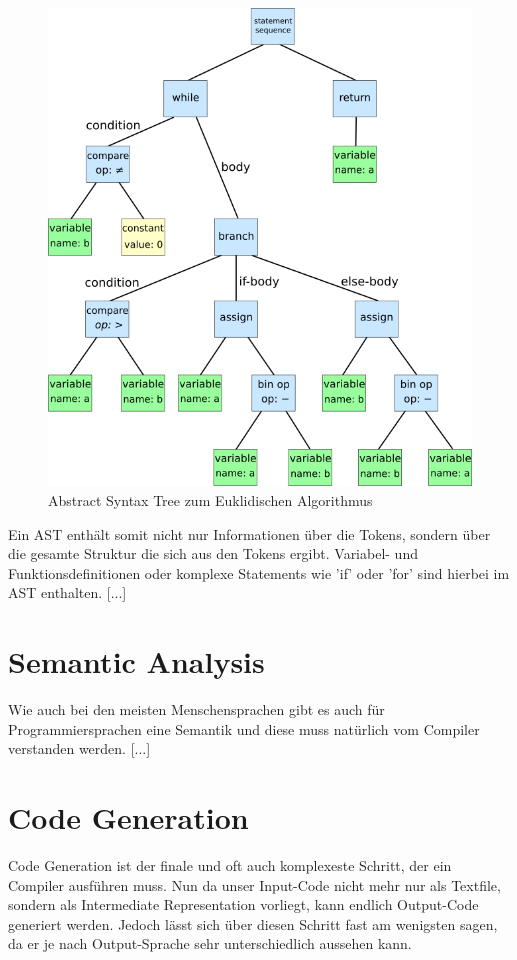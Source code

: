 \begin{figure}[h!]
    \centering
    \includegraphics[scale=0.3]{resources/syntaxtree.svg.png}
    \caption{Abstract Syntax Tree zum Euklidischen Algorithmus}
    \label{fig:syntax-tree}
\end{figure}

Ein AST enthält somit nicht nur Informationen über die Tokens, sondern über die gesamte Struktur die sich aus den Tokens ergibt. Variabel- und Funktionsdefinitionen oder komplexe Statements wie 'if' oder 'for' sind hierbei im AST enthalten.
[...]

\section{Semantic Analysis}
Wie auch bei den meisten Menschensprachen gibt es auch für Programmiersprachen eine Semantik und diese muss natürlich vom Compiler verstanden werden. [...]


\section{Code Generation}
Code Generation ist der finale und oft auch komplexeste Schritt, der ein Compiler ausführen muss. Nun da unser Input-Code nicht mehr nur als Textfile, sondern als Intermediate Representation vorliegt, kann endlich Output-Code generiert werden.
Jedoch lässt sich über diesen Schritt fast am wenigsten sagen, da er je nach Output-Sprache sehr unterschiedlich aussehen kann. 

